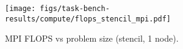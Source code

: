 \begin{figure}[t]
\centering
\texttt{[image: figs/task-bench-results/compute/flops\_stencil\_mpi.pdf]}
\caption{MPI FLOPS vs problem size (stencil, 1 node).\label{fig:flops-mpi}}
\end{figure}
